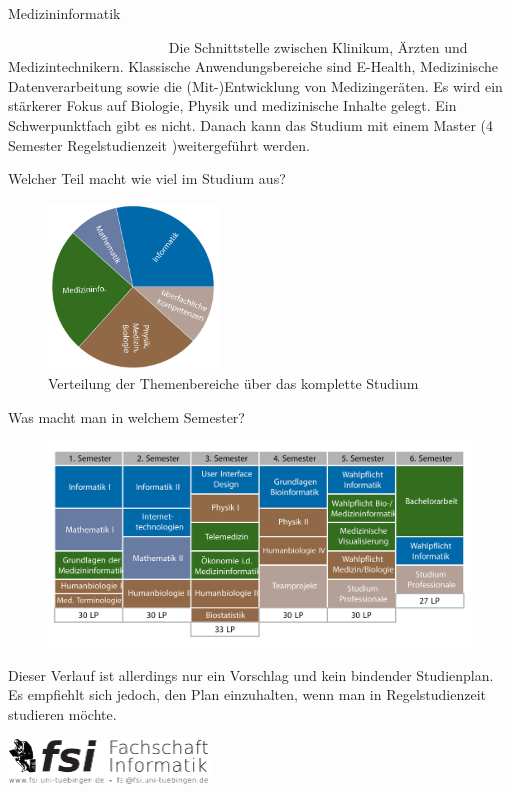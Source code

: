 	\begin{Huge}
			Medizininformatik
		\end{Huge}
		\begin{exampleblock}{\textcolor{white}{Was ist der Studiengang?}}
			Die Schnittstelle zwischen Klinikum, Ärzten und Medizintechnikern. Klassische Anwendungsbereiche sind E-Health, Medizinische Datenverarbeitung sowie die (Mit-)Entwicklung von Medizingeräten. Es wird ein stärkerer Fokus auf Biologie, Physik und medizinische Inhalte gelegt. Ein Schwerpunktfach gibt es nicht. Danach kann das Studium mit einem Master (4 Semester Regelstudienzeit )weitergeführt werden.
		\end{exampleblock}
	
	\begin{block}{Welcher Teil macht wie viel im Studium aus?}
		\begin{figure}[h!]
			\includegraphics[width=0.4\textwidth]{charts/medizininformatik-Piechart.pdf}
			\caption{Verteilung der Themenbereiche über das komplette Studium}
		\end{figure}
	\end{block}
	
	\begin{block}{Was macht man in welchem Semester?}
		\begin{figure}[h!]
			\includegraphics[width=\textwidth]{charts/medizininformatik_Studienplan_abWS18.pdf}
		\end{figure}
		Dieser Verlauf ist allerdings nur ein Vorschlag und kein bindender Studienplan. Es empfiehlt sich jedoch, den Plan einzuhalten, wenn man in Regelstudienzeit studieren möchte.
	\end{block}
\vfill
\begin{flushright}
	\includegraphics[width=0.4\textwidth]{fsilogo.pdf}
\end{flushright}